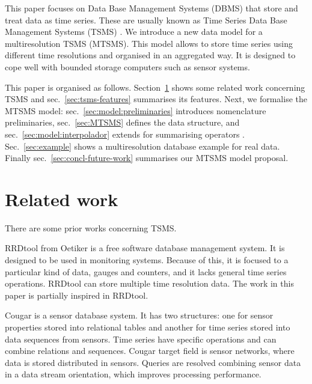 
This paper focuses on Data Base Management Systems (DBMS) that store
and treat data as time series. These are usually known as Time Series
Data Base Management Systems (TSMS) \cite{dreyer94}.  We introduce a
new data model for a multiresolution TSMS (MTSMS). This model allows
to store time series using different time resolutions and organised in
an aggregated way. It is designed to cope well with bounded storage
computers such as sensor systems.


This paper is organised as follows.  Section~\ref{sec:related-work}
shows some related work concerning TSMS and
sec.~\ref{sec:tsms-features} summarises its features.  Next, we
formalise the MTSMS model: sec.~\ref{sec:model:preliminaries}
introduces nomenclature
preliminaries, %
sec.~\ref{sec:MTSMS} defines the data
structure, %
and sec.~\ref{sec:model:interpolador} extends for summarising
operators%
. Sec.~\ref{sec:example} shows a multiresolution database example for
real data. Finally sec.~\ref{sec:concl-future-work} summarises our
MTSMS model proposal.%






\section{Related work}
\label{sec:related-work}

There are some prior works concerning TSMS. 

RRDtool from Oetiker \cite{rrdtool} is a free software database
management system. It is designed to be used in monitoring
systems. Because of this, it is focused to a particular kind of data,
gauges and counters, and it lacks general time series
operations. RRDtool can store multiple time resolution data. The work
in this paper is partially inspired in RRDtool.

Cougar \cite{bonnet01} is a sensor database system. It has two
structures: one for sensor properties stored into relational tables
and another for time series stored into data sequences from
sensors. Time series have specific operations and can combine
relations and sequences. Cougar target field is sensor networks, where
data is stored distributed in sensors. Queries are resolved
combining sensor data in a data stream orientation, which improves
processing performance. 


